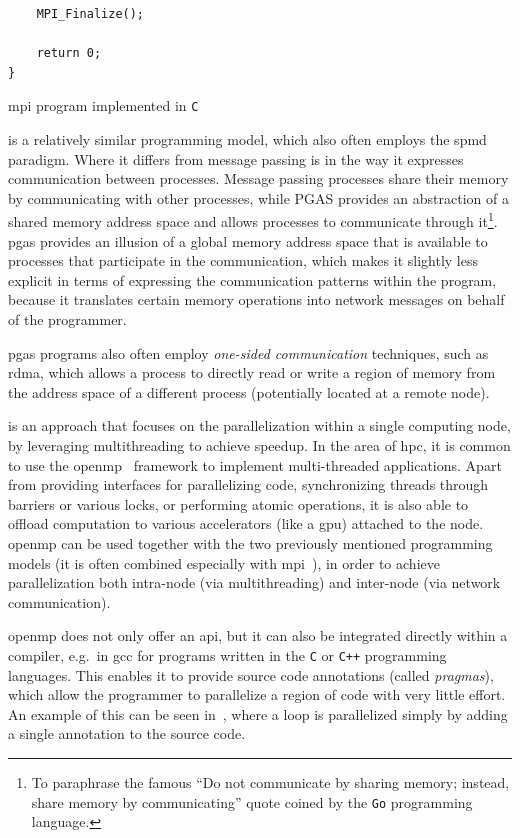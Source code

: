 \begin{description}[wide=0pt]
\begin{listing}[h]
\begin{verbatim}
	MPI_Finalize();

	return 0;
}
		  	\end{verbatim}
			\caption{\gls{mpi} program implemented in \texttt{C}}
			\label{lst:mpi-example}
		\end{listing}

	\item[\gls{pgas}~\cite{pgas}] is a relatively similar programming model, which also often employs the \gls{spmd}
		paradigm. Where it differs from message passing is in the way it expresses communication between
		processes. Message passing processes share their memory by communicating with other processes,
		while PGAS provides an abstraction of a shared memory address space and allows processes to
		communicate through it\footnote{To paraphrase the famous ``Do not communicate by sharing memory; instead, share memory by communicating'' quote coined by the \texttt{Go} programming language.}. \gls{pgas} provides an illusion of a
		global memory address space that is available to processes that participate in the communication,
		which makes it slightly less explicit in terms of expressing the communication patterns within the
		program, because it translates certain memory operations into network messages on behalf of the
		programmer.

		\gls{pgas} programs also often employ \emph{one-sided communication} techniques, such
		as \gls{rdma}, which allows a process to directly read or write a region of memory from
		the address space of a different process (potentially located at a remote node).

	\item[Shared-memory multiprocessing] is an approach that focuses on the parallelization within a single computing node, by leveraging
		multithreading to achieve speedup. In the area of \gls{hpc}, it is common to use the
		\gls{openmp}~\cite{openmp} framework to implement multi-threaded applications.
		Apart from providing interfaces for parallelizing code, synchronizing threads through barriers or
		various locks, or performing atomic operations, it is also able to offload computation to various
		accelerators (like a \gls{gpu}) attached to the node. \gls{openmp} can be
		used together with the two previously mentioned programming models (it is often combined especially
		with \gls{mpi}~\cite{hybrid_openmp_mpi}), in order to achieve parallelization both
		intra-node (via multithreading) and inter-node (via network communication).

		\gls{openmp} does not only offer an \gls{api}, but it can also be
		integrated directly within a compiler, e.g.\ in \gls{gcc} for programs written in the
		\texttt{C} or \texttt{C++} programming languages. This enables it to provide
		source code annotations (called \emph{pragmas}), which allow the programmer to parallelize
		a region of code with very little effort. An example of this can be seen in~,
		where a loop is parallelized simply by adding a single annotation to the source code.


\end{description}
